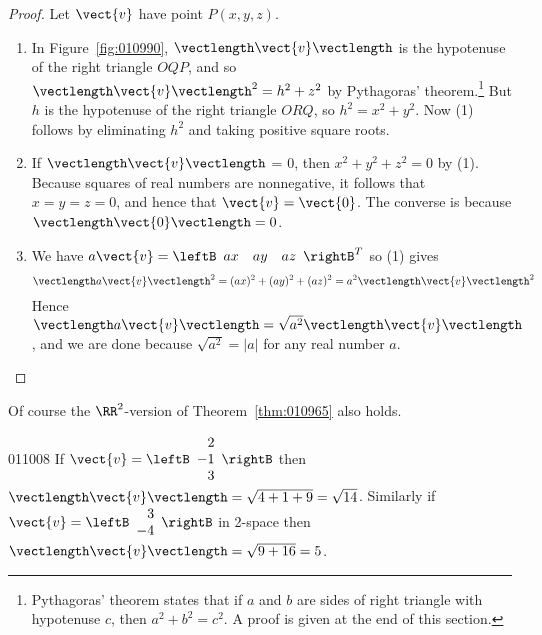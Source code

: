 \begin{proof} Let $\vect{v}$ have point $P(x, y, z)$.
\begin{enumerate}
\item In Figure~\ref{fig:010990}, $\vectlength\vect{v}\vectlength$ is the hypotenuse of the right triangle $OQP$, and so $\vectlength\vect{v}\vectlength^2 = h^{2} + z^{2}$ by Pythagoras' theorem.\footnote{Pythagoras' theorem states that if $a$ and $b$ are sides of right triangle with hypotenuse $c$, then $a^{2} + b^{2} = c^{2}$. A proof is given at the end of this section.}
 But $h$ is the hypotenuse of the right triangle $ORQ$, so $h^{2} = x^{2} + y^{2}$. Now (1) follows by eliminating $h^{2}$ and taking positive square roots.

\item If $\vectlength\vect{v}\vectlength$ = 0, then $x^{2} + y^{2} + z^{2} = 0$ by (1). Because squares of real numbers are nonnegative, it follows that $x = y = z = 0$, and hence that $\vect{v} = \vect{0}$. The converse is because $\vectlength\vect{0}\vectlength = 0$.

\item We have $a\vect{v} = \leftB \begin{array}{ccc} ax &  ay & az \end{array}\rightB^{T}$ so (1) gives 
\begin{equation*}
\vectlength a\vect{v}\vectlength^2 = (ax)^2 + (ay)^2 + (az)^2 = a^{2}\vectlength\vect{v}\vectlength^2
\end{equation*}
 Hence $\vectlength a\vect{v}\vectlength = \sqrt{a^2} \vectlength \vect{v} \vectlength$, and we are done because $\sqrt{a^2} = |a|$ for any real number $a$.
\end{enumerate}
\vspace*{-2em}\end{proof}

\noindent Of course the $\RR^2$-version of Theorem~\ref{thm:010965} also holds.


\begin{example}{}{011008}
If
$\vect{v} = \leftB
\begin{array}{r}
2 \\
-1 \\
3 
\end{array}
\rightB$ 
 then $\vectlength \vect{v} \vectlength = \sqrt{4 + 1 + 9} = \sqrt{14}$. Similarly if 
$\vect{v} = \leftB
\begin{array}{r}
3 \\
-4  
\end{array}
\rightB$ 
in 2-space then \\$\vectlength \vect{v} \vectlength = \sqrt{9 + 16} = 5$.
\end{example}

